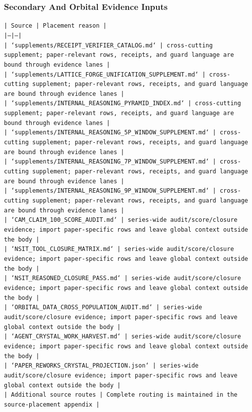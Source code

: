 \documentclass[11pt]{article}
\begin{document}
\subsubsection*{Secondary And Orbital Evidence Inputs}

\noindent\texttt{| Source | Placement reason |}\\
\noindent\texttt{|---|---|}\\
\noindent\texttt{| `supplements/RECEIPT\_VERIFIER\_CATALOG.md` | cross-cutting supplement; paper-relevant rows, receipts, and guard language are bound through evidence lanes |}\\
\noindent\texttt{| `supplements/LATTICE\_FORGE\_UNIFICATION\_SUPPLEMENT.md` | cross-cutting supplement; paper-relevant rows, receipts, and guard language are bound through evidence lanes |}\\
\noindent\texttt{| `supplements/INTERNAL\_REASONING\_PYRAMID\_INDEX.md` | cross-cutting supplement; paper-relevant rows, receipts, and guard language are bound through evidence lanes |}\\
\noindent\texttt{| `supplements/INTERNAL\_REASONING\_5P\_WINDOW\_SUPPLEMENT.md` | cross-cutting supplement; paper-relevant rows, receipts, and guard language are bound through evidence lanes |}\\
\noindent\texttt{| `supplements/INTERNAL\_REASONING\_7P\_WINDOW\_SUPPLEMENT.md` | cross-cutting supplement; paper-relevant rows, receipts, and guard language are bound through evidence lanes |}\\
\noindent\texttt{| `supplements/INTERNAL\_REASONING\_9P\_WINDOW\_SUPPLEMENT.md` | cross-cutting supplement; paper-relevant rows, receipts, and guard language are bound through evidence lanes |}\\
\noindent\texttt{| `CAM\_CLAIM\_100\_SCORE\_AUDIT.md` | series-wide audit/score/closure evidence; import paper-specific rows and leave global context outside the body |}\\
\noindent\texttt{| `NSIT\_TOOL\_CLOSURE\_MATRIX.md` | series-wide audit/score/closure evidence; import paper-specific rows and leave global context outside the body |}\\
\noindent\texttt{| `NSIT\_REASONED\_CLOSURE\_PASS.md` | series-wide audit/score/closure evidence; import paper-specific rows and leave global context outside the body |}\\
\noindent\texttt{| `ORBITAL\_DATA\_CROSS\_POPULATION\_AUDIT.md` | series-wide audit/score/closure evidence; import paper-specific rows and leave global context outside the body |}\\
\noindent\texttt{| `AGENT\_CRYSTAL\_WORK\_HARVEST.md` | series-wide audit/score/closure evidence; import paper-specific rows and leave global context outside the body |}\\
\noindent\texttt{| `PAPER\_REWORKS\_CRYSTAL\_PROJECTION.json` | series-wide audit/score/closure evidence; import paper-specific rows and leave global context outside the body |}\\
\noindent\texttt{| Additional source routes | Complete routing is maintained in the source-placement appendix |}\\
\end{document}
